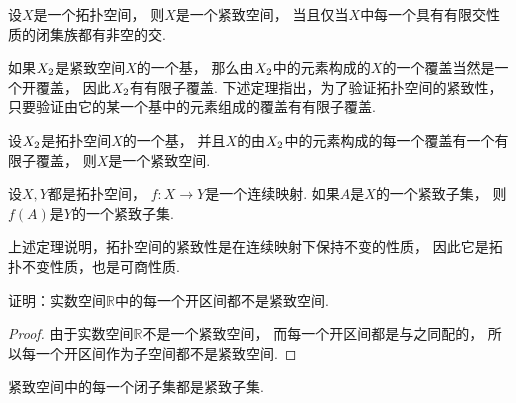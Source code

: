 \begin{theorem}
设\(X\)是一个拓扑空间，
则\(X\)是一个紧致空间，
当且仅当\(X\)中每一个具有有限交性质的闭集族都有非空的交.
\end{theorem}

如果\(X_2\)是紧致空间\(X\)的一个基，
那么由\(X_2\)中的元素构成的\(X\)的一个覆盖当然是一个开覆盖，
因此\(X_2\)有有限子覆盖.
下述定理指出，为了验证拓扑空间的紧致性，
只要验证由它的某一个基中的元素组成的覆盖有有限子覆盖.
\begin{theorem}
设\(X_2\)是拓扑空间\(X\)的一个基，
并且\(X\)的由\(X_2\)中的元素构成的每一个覆盖有一个有限子覆盖，
则\(X\)是一个紧致空间.
\end{theorem}

\begin{theorem}
设\(X,Y\)都是拓扑空间，
\(f\colon X \to Y\)是一个连续映射.
如果\(A\)是\(X\)的一个紧致子集，
则\(f(A)\)是\(Y\)的一个紧致子集.
\end{theorem}
上述定理说明，拓扑空间的紧致性是在连续映射下保持不变的性质，
因此它是拓扑不变性质，也是可商性质.

\begin{example}
证明：实数空间\(\mathbb{R}\)中的每一个开区间都不是紧致空间.
\begin{proof}
由于实数空间\(\mathbb{R}\)不是一个紧致空间，
而每一个开区间都是与之同配的，
所以每一个开区间作为子空间都不是紧致空间.
\end{proof}
\end{example}

\begin{theorem}
紧致空间中的每一个闭子集都是紧致子集.
\end{theorem}

